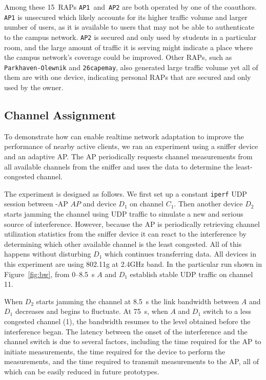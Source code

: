 Among these 15~RAPs \texttt{AP1}~and~\texttt{AP2} are both operated by one of the
coauthors. \texttt{AP1} is unsecured which likely accounts for its higher
traffic volume and larger number of users, as it is available to users that
may not be able to authenticate to the campus network. \texttt{AP2} is
secured and only used by students in a particular room, and the large amount
of traffic it is serving might indicate a place where the campus network's
coverage could be improved. Other RAPs, such as \texttt{Parkhaven-Olewnik}
and \texttt{26capemay}, also generated large traffic volume yet all of them
are with one device, indicating personal RAPs that are secured and only used
by the owner.

\subsection{Channel Assignment}
\label{subsec-channel}

To demonstrate how \PS{} can enable realtime network adaptation to improve
the performance of nearby active clients, we ran an experiment using a
sniffer device and an adaptive AP. The AP periodically requests channel
measurements from all available channels from the sniffer and uses the data
to determine the least-congested channel.

The experiment is designed as follows. We first set up a constant
\texttt{iperf} UDP session between \PS{}-AP $AP$ and device $D_1$ on channel
$C_1$. Then another device $D_2$ starts jamming the channel using UDP traffic
to simulate a new and serious source of interference. However, because the AP
is periodically retrieving channel utilization statistics from the sniffer
device it can react to the interference by determining which other available
channel is the least congested. All of this happens without disturbing $D_1$
which continues transferring data. All devices in this experiment are using
802.11g at 2.4GHz band. In the particular run shown in Figure~\ref{fig:bw},
from 0--8.5~s $A$ and $D_1$ establish stable UDP traffic on channel 11.

When $D_2$ starts jamming the channel at 8.5~s the link bandwidth between $A$
and $D_1$ decreases and begins to fluctuate. At 75~s, when $A$ and $D_1$
switch to a less congested channel (1), the bandwidth resumes to the level
obtained before the interference began. The latency between the onset of the
interference and the channel switch is due to several factors, including the
time required for the AP to initiate measurements, the time required for the
device to perform the measurements, and the time required to transmit measurements to
the AP, all of which can be easily reduced in future prototypes.


